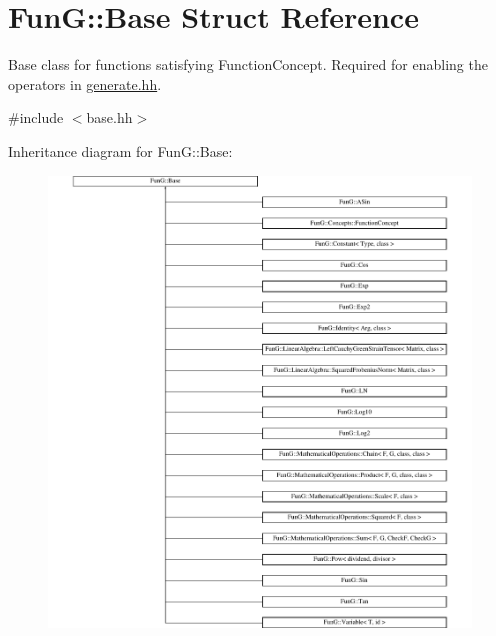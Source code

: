 \hypertarget{structFunG_1_1Base}{\section{Fun\-G\-:\-:Base Struct Reference}
\label{structFunG_1_1Base}
}


Base class for functions satisfying Function\-Concept. Required for enabling the operators in \hyperlink{generate_8hh_source}{generate.\-hh}.  




{\ttfamily \#include $<$base.\-hh$>$}

Inheritance diagram for Fun\-G\-:\-:Base\-:\begin{figure}[H]
\begin{center}
\leavevmode
\includegraphics[height=12.000000cm]{structFunG_1_1Base}
\end{center}
\end{figure}
